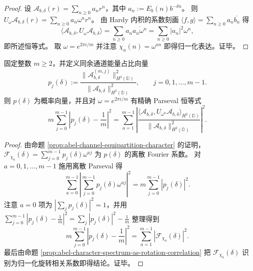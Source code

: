 \begin{proof}
设 \(\mathcal A_{b,\delta}(r)=\sum_{n\ge 0}a_nr^n\)，其中 \(a_n:=E_b(n)b^{-\delta n}\)。
则
\(
U_\omega \mathcal A_{b,\delta}(r)=\sum_{n\ge 0}a_n\omega^n r^n
\)。
由 Hardy 内积的系数刻画 \(\langle f,g\rangle=\sum_{n\ge 0}a_n\overline{b_n}\) 得
\[
\langle \mathcal A_{b,\delta},U_\omega\mathcal A_{b,\delta}\rangle
=\sum_{n\ge 0}a_n\overline{a_n\omega^n}
=\sum_{n\ge 0}|a_n|^2\omega^n,
\]
即所述恒等式。
取 \(\omega=e^{2\pi i/m}\) 并注意 \(\chi_a(n)=\omega^{a n}\) 即得归一化表达。证毕。
\end{proof}

\begin{corollary}\label{cor:abel-congruence-energy-parseval-barcode}
固定整数 \(m\ge 2\)，并定义同余通道能量占比向量
\[
p_j(\delta):=\frac{\|\mathcal A_{b,\delta}^{(m,j)}\|_{H^2(\mathbb D)}^2}{\|\mathcal A_{b,\delta}\|_{H^2(\mathbb D)}^2},
\qquad j=0,1,\dots,m-1.
\]
则 \(p(\delta)\) 为概率向量，并且对 \(\omega=e^{2\pi i/m}\) 有精确 Parseval 恒等式
\[
\boxed{\;
m\sum_{j=0}^{m-1}\left|p_j(\delta)-\frac1m\right|^2
=\sum_{a=1}^{m-1}\left|
\frac{\langle \mathcal A_{b,\delta},U_{\omega^{a}}\mathcal A_{b,\delta}\rangle_{H^2(\mathbb D)}}
{\|\mathcal A_{b,\delta}\|_{H^2(\mathbb D)}^2}
\right|^2.\;}
\]
\end{corollary}

\begin{proof}
由命题 \ref{prop:abel-channel-equipartition-character} 的证明，\(\mathcal F_{\chi_a}(\delta)=\sum_{j=0}^{m-1}p_j(\delta)\omega^{aj}\) 为 \(p(\delta)\) 的离散 Fourier 系数。
对 \(a=0,1,\dots,m-1\) 施用离散 Parseval 得
\[
\sum_{a=0}^{m-1}\left|\sum_{j=0}^{m-1}p_j(\delta)\omega^{aj}\right|^2
=m\sum_{j=0}^{m-1}|p_j(\delta)|^2.
\]
注意 \(a=0\) 项为 \(|\sum_j p_j(\delta)|^2=1\)，并用
\(
\sum_{j=0}^{m-1}\left|p_j(\delta)-\frac1m\right|^2=\sum_j|p_j(\delta)|^2-\frac1m
\)
整理得到
\[
m\sum_{j=0}^{m-1}\left|p_j(\delta)-\frac1m\right|^2
=\sum_{a=1}^{m-1}|\mathcal F_{\chi_a}(\delta)|^2.
\]
最后由命题 \ref{prop:abel-character-spectrum-as-rotation-correlation} 把 \(\mathcal F_{\chi_a}(\delta)\) 识别为归一化旋转相关系数即得结论。证毕。
\end{proof}
